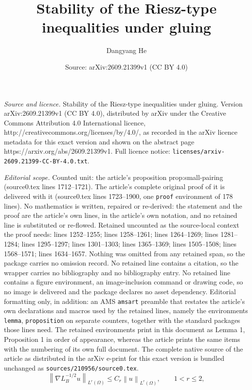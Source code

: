 \documentclass[10pt,a4paper]{amsart}
\title{Stability of the Riesz-type inequalities under gluing}
\author{Dangyang He}
\date{Source: arXiv:2609.21399v1 (CC BY 4.0)}
\newcommand{\norm}[2]{\left\lVert #1\right\rVert_{#2}}
\begin{document}
\maketitle

\noindent\emph{Source and licence.} Stability of the Riesz-type inequalities under gluing. Version arXiv:2609.21399v1 (CC BY 4.0), distributed by arXiv under the Creative Commons Attribution 4.0 International licence, http://creativecommons.org/licenses/by/4.0/, as recorded in the arXiv licence metadata for this exact version and shown on the abstract page https://arxiv.org/abs/2609.21399v1. Full licence notice: \texttt{licenses/arxiv-2609.21399-CC-BY-4.0.txt}.\par\smallskip

\noindent\textit{Editorial scope.} Counted unit: the article's proposition prop:small-pairing (source0.tex lines 1712--1721). The article's complete original proof of it is delivered with it (source0.tex lines 1723--1900, one \texttt{proof} environment of 178 lines). No mathematics is written, repaired or re-derived: the statement and the proof are the article's own lines, in the article's own notation, and no retained line is substituted or re-flowed.  Retained uncounted as the source-local context the proof needs: lines 1252--1255; lines 1258--1261; lines 1264--1269; lines 1281--1284; lines 1295--1297; lines 1301--1303; lines 1365--1369; lines 1505--1508; lines 1568--1571; lines 1634--1657.  Nothing was omitted from any retained span, so the package carries no omission record.  No retained line contains a citation, so the wrapper carries no bibliography and no bibliography entry.  No retained line contains a figure environment, an image-inclusion command or drawing code, so no image is delivered and the package declares no asset dependency.  Editorial formatting only, in addition: an AMS \texttt{amsart} preamble that restates the article's own declarations and macros used by the retained lines, namely the environments \texttt{lemma}, \texttt{proposition} on separate counters, together with the standard packages those lines need.  The retained environments print in this document as Lemma 1, Proposition 1 in order of appearance, whereas the article prints the same items with the numbering of its own full document.  The complete native source of the article as distributed in the arXiv e-print for this exact version is bundled unchanged as \texttt{sources/210956/source0.tex}.
\begin{equation}\label{eq:exterior-low-Riesz}
 \norm{\nabla L_B^{-1/2}u}{L^r(\Omega)}
 \leq C_r\norm u{L^r(\Omega)},\qquad 1<r\leq2,
\end{equation}
\end{document}
